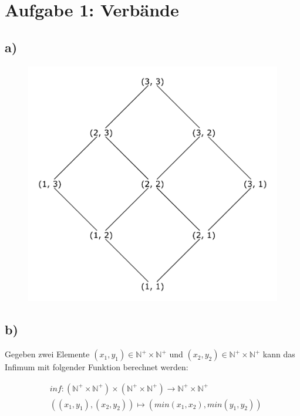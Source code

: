 \section*{Aufgabe 1: Verbände}
\subsection*{a)}

\begin{figure}[h!]
\begin{center}
\includegraphics[width=13cm]{aufgabe1a-hasse}
\end{center}
\end{figure}

\subsection*{b)}
Gegeben zwei Elemente $(x_1, y_1) \in \mathbb{N}^+ \times \mathbb{N}^+ $ und
$(x_2, y_2) \in \mathbb{N}^+ \times \mathbb{N}^+ $ kann das Infimum mit folgender Funktion berechnet werden:

\begin{align*}
&inf:  (\mathbb{N}^+ \times \mathbb{N}^+) \times  (\mathbb{N}^+ \times \mathbb{N}^+)  \to \mathbb{N}^+ \times \mathbb{N}^+ \\
&((x_1, y_1), (x_2, y_2))  \mapsto (min(x_1, x_2), min(y_1, y_2))
\end{align*}

